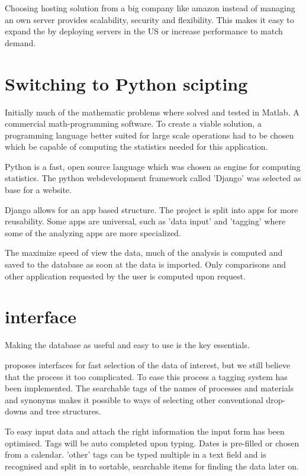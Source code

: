\documentclass[aip,amsmath,reprint, author-year]{revtex4-1}
\begin{document}
Choosing hosting solution from a big company like amazon instead of managing an own server provides scalability, security and flexibility. This makes it easy to expand the by deploying servers in the US or increase performance to match demand.

\section{Switching to Python scipting}
Initially much of the mathematic problems where solved and tested in Matlab. A commercial math-programming software. To create a viable solution, a programming language better suited for large scale operations had to be chosen which be capable of computing the statistics needed for this application.

Python is a fast, open source language which was chosen as engine for computing statistics. The python webdevelopment framework called 'Django' was selected as base for a website.

Django allows for an app based structure. The project is split into apps for more reusability. Some apps are universal, such as 'data input' and 'tagging' where some of the analyzing apps are more specialized.

The maximize speed of view the data, much of the analysis is computed and saved to the database as soon at the data is imported. Only comparisons and other application requested by the user is computed upon request.

\section{interface}
Making the database as useful and easy to use is the key essentials. 

\cite{kern2003forecasting, thornton2004variation} proposes interfaces for fast selection of the data of interest, but we still believe that the process it too complicated. To ease this process a tagging system has been implemented.
The searchable tags of the names of processes and materials and synonyms makes it possible to ways of selecting other conventional drop-downs and tree structures.

To easy input data and attach the right information the input form has been optimised. Tags will be auto completed upon typing. Dates is pre-filled or chosen from  a calendar. 'other' tags can be typed multiple in a text field and is recognised and split in to sortable, searchable items for finding the data later on.
\end{document}
